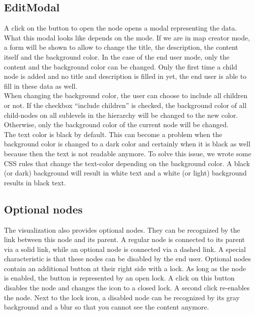 \subsection{EditModal}\label{sec:editmodal}
A click on the button to open the node opens a modal representing the data. What this modal looks like depends on the mode. If we are in map creator mode, a form will be shown to allow to change the title, the description, the content itself and the background color. In the case of the end user mode, only the content and the background color can be changed. Only the first time a child node is added and no title and description is filled in yet, the end user is able to fill in these data as well.\\

When changing the background color, the user can choose to include all children or not. If the checkbox ``include children'' is checked, the background color of all child-nodes on all sublevels in the hierarchy will be changed to the new color. Otherwise, only the background color of the current node will be changed.\\

The text color is black by default. This can become a problem when the background color is changed to a dark color and certainly when it is black as well because then the text is not readable anymore. To solve this issue, we wrote some CSS rules that change the text-color depending on the background color. A black (or dark) background will result in white text and a white (or light) background results in black text.
 


\subsection{Optional nodes}\label{sec:optional-nodes}
The visualization also provides optional nodes. They can be recognized by the link between this node and its parent. A regular node is connected to its parent via a solid link, while an optional node is connected via a dashed link. A special characteristic is that these nodes can be disabled by the end user. Optional nodes contain an additional button at their right side with a lock. As long as the node is enabled, the button is represented by an open lock. A click on this button disables the node and changes the icon to a closed lock. A second click re-enables the node. Next to the lock icon, a disabled node can be recognized by its gray background and a blur so that you cannot see the content anymore.














